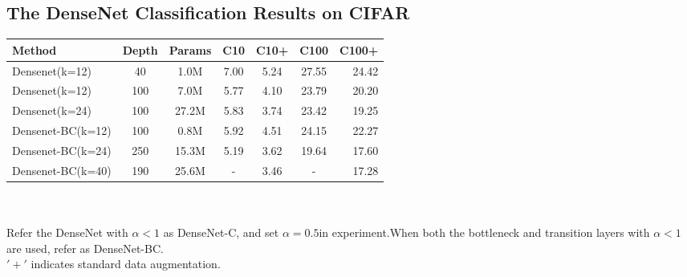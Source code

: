 \subsection{The DenseNet Classification Results on CIFAR}
\begin{tabular}{| l | c | c | c  | c | c | r |}
\hline
Method              &   Depth   & Params   & C10   & C10+   & C100   &   C100+ \\
\hline
Densenet(k=12)      &    40     & 1.0M     & 7.00  & 5.24   & 27.55  &   24.42  \\
\hline
Densenet(k=12)      &   100     & 7.0M     & 5.77  & 4.10   & 23.79  &   20.20  \\
\hline
Densenet(k=24)      &   100     & 27.2M    & 5.83  & 3.74   & 23.42  &   19.25  \\
\hline
Densenet-BC(k=12)   &   100     & 0.8M     & 5.92  & 4.51   & 24.15  &   22.27  \\
\hline
Densenet-BC(k=24)   &   250     & 15.3M    & 5.19  & 3.62   & 19.64  &   17.60  \\
\hline
Densenet-BC(k=40)   &   190     & 25.6M    & -     & 3.46   & -      &   17.28  \\
\hline
\end{tabular}
\\ \hspace*{\fill} \\
Refer the DenseNet with $\alpha<1$ as DenseNet-C, and  set $\alpha=0.5$in experiment.When both the bottleneck and transition layers with $\alpha<1$
are used, refer  as DenseNet-BC.\\
$'+'$ indicates standard data augmentation.
